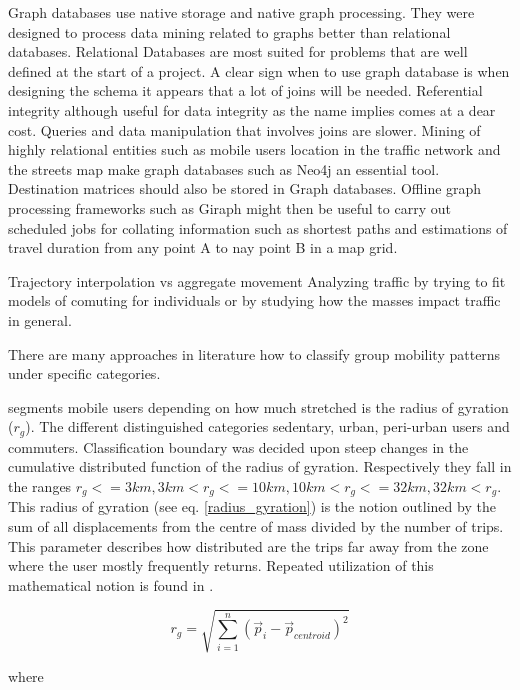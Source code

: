 \documentclass[12pt, a4paper]{report}
\theoremstyle{definition}
\theoremstyle{definition}%
\theoremstyle{definition}%
\theoremstyle{definition}%
\theoremstyle{definition}%
\theoremstyle{definition}%
\begin{document}
Graph databases use native storage and native graph processing. They were designed to process data mining related to graphs better than relational databases. Relational Databases are most suited for problems that are well defined at the start of a project. A clear sign when to use graph database is when designing the schema it appears that a lot of joins will be needed. Referential integrity although useful for data integrity as the name implies comes at a dear cost. Queries and data manipulation that involves joins are slower.  Mining of highly relational entities such as mobile users location in the traffic network and the streets map make graph databases such as Neo4j an essential tool. Destination matrices should also be stored in Graph databases. Offline graph processing frameworks such as Giraph might then be useful to carry out scheduled jobs for collating information such as shortest paths and estimations of travel duration from any point A to nay point B in a map grid.



Trajectory interpolation vs aggregate movement
Analyzing traffic by trying to fit models of comuting for individuals or by studying how the masses impact traffic in general.

There are many approaches in literature how to classify group mobility patterns under specific categories.

\cite{Hoteit2014} segments mobile users depending on how much stretched is the radius of gyration (\(r_{g}\)). The different distinguished categories sedentary, urban, peri-urban users and commuters. Classification boundary was decided upon steep changes in the cumulative distributed function of the radius of gyration. Respectively they fall in the ranges \(r_{g} <= 3km, 3km < r_{g} <= 10km, 10km < r_{g} <= 32km, 32km < r_{g}\). This radius of gyration (see eq. \ref{radius_gyration}) is the notion outlined by the sum of all displacements from the centre of mass divided by the number of trips. This parameter describes how distributed are the trips far away from the zone where the user mostly frequently returns. Repeated utilization of this mathematical notion is found in \cite{Hoteit2014,Gonzalez2008,Hoteit2016}.

\begin{equation} \label{radius_gyration}
r_{g} = \sqrt{\sum _{i=1}^{n}({\stackrel{\to }{p}}_{i}-{\stackrel{\to }{p}}_{centroid})^2}
\end{equation}

where 
\end{document}
